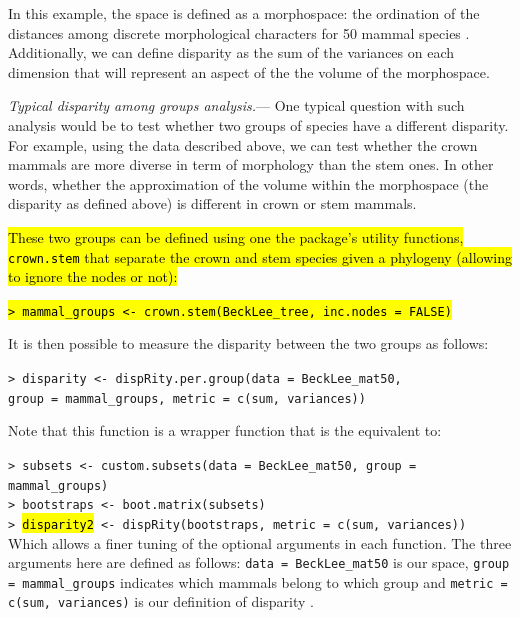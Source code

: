 \documentclass[12pt,letterpaper]{article}
\renewcommand{\subsubsection}[1]{%
\vspace{2ex}
\noindent
\textit{#1.}---}
\begin{document}
In this example, the space is defined as a morphospace: the ordination of the distances among discrete morphological characters for 50 mammal species \citep[from][]{beckancient2014}.
Additionally, we can define disparity as the sum of the variances on each dimension \citep{foote1991morphological,Wills1994} that will represent an aspect of the the volume of the morphospace.

\subsubsection{Typical disparity among groups analysis}
One typical question with such analysis would be to test whether two groups of species have a different disparity.
For example, using the data described above, we can test whether the crown mammals are more diverse in term of morphology than the stem ones.
In other words, whether the approximation of the volume within the morphospace (the disparity as defined above) is different in crown or stem mammals.

\hl{\noindent These two groups can be defined using one the package's utility functions, \texttt{crown.stem} that separate the crown and stem species given a phylogeny (allowing to ignore the nodes or not):}

\noindent
\hl{\texttt{> mammal\_groups <- crown.stem(BeckLee\_tree, inc.nodes = FALSE)}}

\noindent It is then possible to measure the disparity between the two groups as follows:

\noindent
\texttt{> disparity <- dispRity.per.group(data = BeckLee\_mat50,}\\
\texttt{group = mammal\_groups, metric = c(sum, variances))}

\noindent Note that this function is a wrapper function that is the equivalent to:

\noindent
\texttt{> subsets <- custom.subsets(data = BeckLee\_mat50, group = mammal\_groups)}\\
\noindent
\texttt{> bootstraps <- boot.matrix(subsets)}\\
\noindent
\texttt{> \hl{disparity2} <- dispRity(bootstraps, metric = c(sum, variances))}\\

\noindent Which allows a finer tuning of the optional arguments in each function.
The three arguments here are defined as follows: \texttt{data = BeckLee\_mat50} is our space, \texttt{group = mammal\_groups} indicates which mammals belong to which group and \texttt{metric = c(sum, variances)} is our definition of disparity \citep{foote1991morphological,Wills1994,Ciampaglio2001}. 
\end{document}
